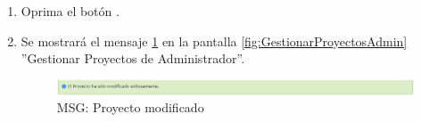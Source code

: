 \begin{enumerate}
			\item Oprima el botón \IUAceptar.
			
			\item Se mostrará el mensaje \ref{fig:proyectoModificado} en la pantalla \ref{fig:GestionarProyectosAdmin} ''Gestionar Proyectos de Administrador''.
			
			\begin{figure}[htbp!]
				\begin{center}
					\includegraphics[scale=0.6]{roles/administrador/proyectosAdmin/gestionarproyectosAdmin/pantallas/IU2-2MSG1}
					\caption{MSG: Proyecto modificado}
					\label{fig:proyectoModificado}
				\end{center}
			\end{figure}
			\end{enumerate}